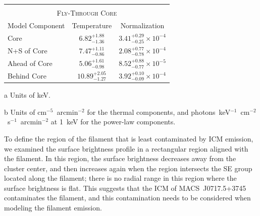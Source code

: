 \begin{table}
\begin{center}
\begin{threeparttable}
\begin{tabular}{l c c}
              \multicolumn{3}{c}{} \\
              \multicolumn{3}{c}{\textsc{Fly-Through Core}} \\
              \hline\hline
                Model Component & Temperature\tnote{a} & Normalization\tnote{b} \\
              \hline
               Core & $6.82_{-1.36}^{+1.88}$ & $3.41_{-0.25}^{+0.29} \times 10^{-4}$ \\
               N+S of Core & $7.47_{-0.86}^{+1.11}$ & $2.08_{-0.78}^{+0.77} \times 10^{-4}$  \\
               Ahead of Core & $5.06_{-0.98}^{+1.61}$ & $8.52_{-0.77}^{+0.88} \times 10^{-5}$  \\
               Behind Core & $10.89_{-1.27}^{+2.05}$ & $3.92_{-0.09}^{+0.10} \times 10^{-4}$  \\
      \end{tabular}
      \begin{tablenotes}
              \item[a] Units of keV.
              \item[b] Units of cm$^{-5}$~arcmin$^{-2}$ for the thermal components, and photons~keV$^{-1}$~cm$^{-2}$~s$^{-1}$~arcmin$^{-2}$ at 1~keV for the power-law components.
      \end{tablenotes}
    \end{threeparttable}
  \end{center}
\end{table}

To define the region of the filament that is least contaminated by ICM emission, we examined the surface brightness profile in a rectangular region aligned with the filament. In this region, the surface brightness decreases away from the cluster center, and then increases again when the region intersects the SE group located along the filament; there is no radial range in this region where the surface brightness is flat. This suggests that the ICM of MACS~J0717.5+3745 contaminates the filament, and this contamination needs to be considered when modeling the filament emission.

